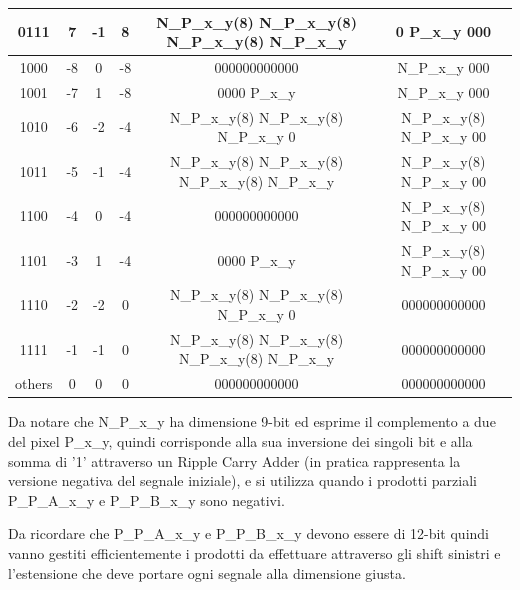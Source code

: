 \begin{itemize}
\begin{table}[H]
{\begin{tabular}{cccccc}
				0111                    & 7                    & -1 & 8  & N\_P\_x\_y(8) N\_P\_x\_y(8) N\_P\_x\_y(8) N\_P\_x\_y & 0 P\_x\_y 000               \\ \hline
				1000                    & -8                   & 0  & -8 & 000000000000                                         & N\_P\_x\_y 000              \\ \hline
				1001                    & -7                   & 1  & -8 & 0000 P\_x\_y                                         & N\_P\_x\_y 000              \\ \hline
				1010                    & -6                   & -2 & -4 & N\_P\_x\_y(8) N\_P\_x\_y(8) N\_P\_x\_y 0             & N\_P\_x\_y(8) N\_P\_x\_y 00 \\ \hline
				1011                    & -5                   & -1 & -4 & N\_P\_x\_y(8) N\_P\_x\_y(8) N\_P\_x\_y(8) N\_P\_x\_y & N\_P\_x\_y(8) N\_P\_x\_y 00 \\ \hline
				1100                    & -4                   & 0  & -4 & 000000000000                                         & N\_P\_x\_y(8) N\_P\_x\_y 00 \\ \hline
				1101                    & -3                   & 1  & -4 & 0000 P\_x\_y                                         & N\_P\_x\_y(8) N\_P\_x\_y 00 \\ \hline
				1110                    & -2                   & -2 & 0 & N\_P\_x\_y(8) N\_P\_x\_y(8) N\_P\_x\_y 0             & 000000000000 \\ \hline
				1111                    & -1                  & -1 & 0 & N\_P\_x\_y(8) N\_P\_x\_y(8) N\_P\_x\_y(8) N\_P\_x\_y & 000000000000 \\ \hline
				others                  & 0                   & 0 & 0 & 000000000000                                               &000000000000 \\ \hline
			\end{tabular}
		}
	\end{table}
	
	Da notare che N\_P\_x\_y  ha dimensione 9-bit ed esprime il complemento a due del pixel P\_x\_y, quindi corrisponde alla sua inversione dei singoli bit e alla somma di '1' attraverso un Ripple Carry Adder (in pratica rappresenta la versione negativa del segnale iniziale), e si utilizza quando i prodotti parziali P\_P\_A\_x\_y e P\_P\_B\_x\_y sono negativi.
	
	Da ricordare che P\_P\_A\_x\_y e P\_P\_B\_x\_y devono essere di 12-bit quindi vanno gestiti efficientemente i prodotti da effettuare attraverso gli shift sinistri e l'estensione che deve portare ogni segnale alla dimensione giusta. 
	

\end{itemize}
